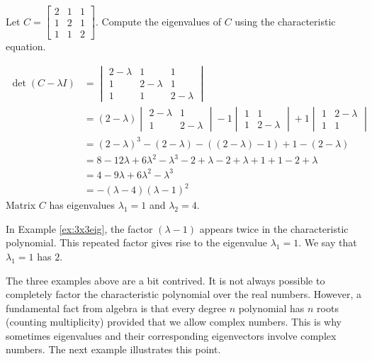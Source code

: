 \documentclass{ximera}
\begin{document}
\begin{example}\label{ex:3x3eig}
Let $C=\begin{bmatrix} 2 & 1 & 1\\ 1 & 2 & 1\\ 1 & 1 & 2\end{bmatrix}$.  Compute the eigenvalues of $C$ using the characteristic equation.
\begin{explanation}
\begin{align*}\det(C-\lambda I)&=\begin{vmatrix}2-\lambda & 1 & 1\\ 1 & 2-\lambda & 1\\ 1 & 1 & 2-\lambda\end{vmatrix}\\
&=(2-\lambda)\begin{vmatrix}2-\lambda&1\\1&2-\lambda\end{vmatrix}-1\begin{vmatrix}1&1\\1&2-\lambda\end{vmatrix}+1\begin{vmatrix}1&2-\lambda\\1&1\end{vmatrix}\\
&=(2-\lambda)^3-(2-\lambda)-((2-\lambda)-1)+1-(2-\lambda)\\
&=8-12\lambda+6\lambda^2-\lambda^3-2+\lambda-2+\lambda+1+1-2+\lambda\\
&=4-9\lambda+6\lambda^2-\lambda^3\\
&=-(\lambda-4)(\lambda-1)^2
\end{align*}
Matrix $C$ has eigenvalues $\lambda_1=1$ and $\lambda_2=4$.
\end{explanation}
\end{example}

In Example \ref{ex:3x3eig}, the factor  $(\lambda-1)$ appears twice in the characteristic polynomial.  This repeated factor gives rise to the eigenvalue $\lambda_1=1$.  We say that $\lambda_1=1$ has  $2$. 

The three examples above are a bit contrived.  It is not always possible to completely factor the characteristic polynomial over the real numbers.  However, a fundamental fact from algebra is that every degree $n$ polynomial has $n$ roots (counting multiplicity) provided that we allow complex numbers.  This is why sometimes eigenvalues and their corresponding eigenvectors involve complex numbers.  The next example illustrates this point.
\end{document}
